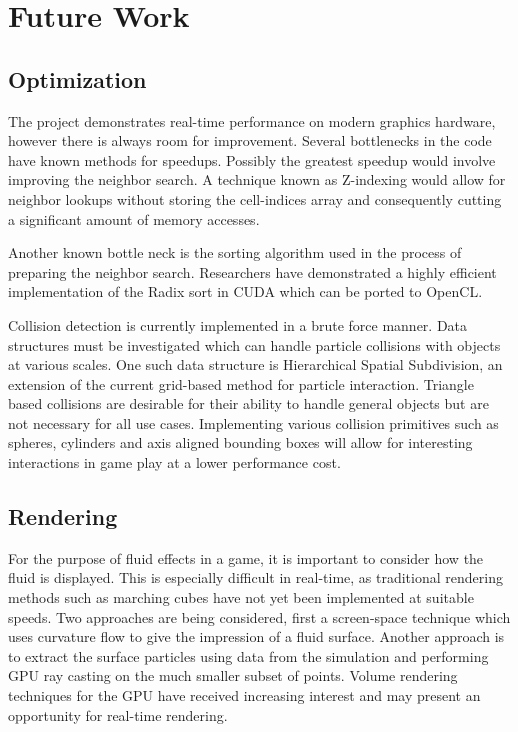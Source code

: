 \chapter{Future Work}

\section{Optimization}

The project demonstrates real-time performance on modern graphics hardware,
however there is always room for improvement. Several bottlenecks in the code
have known methods for speedups. Possibly the greatest speedup would involve
improving the neighbor search. A technique known as Z-indexing would allow for
neighbor lookups without storing the cell-indices array and consequently
cutting a significant amount of memory accesses.\cite{Goswami2010}


Another known bottle neck is the sorting algorithm used in the process of
preparing the neighbor search. Researchers have demonstrated a highly efficient
implementation of the Radix sort in CUDA\cite{Merrill:Sorting:2010} which can be ported to OpenCL.


Collision detection is currently implemented in a brute force manner. Data
structures must be investigated which can handle particle collisions with
objects at various scales. One such data structure is Hierarchical Spatial
Subdivision, an extension of the current grid-based method for particle
interaction.\cite{Pouchol2009} Triangle based collisions are desirable for
their ability to handle general objects but are not necessary for all use
cases. Implementing various collision primitives such as spheres, cylinders and
axis aligned bounding boxes will allow for interesting interactions in game
play at a lower performance cost. 


\section{Rendering}
For the purpose of fluid effects in a game, it is important to consider how the
fluid is displayed. This is especially difficult in real-time, as traditional
rendering methods such as marching cubes have not yet been implemented at
suitable speeds.
Two approaches are being considered, first a screen-space technique which uses
curvature flow to give the impression of a fluid surface.\cite{VanderLaan2009}
Another approach is to extract the surface particles using data from the
simulation and performing GPU ray casting on the much smaller subset of
points.\cite{Goswami2010} Volume rendering techniques for the GPU have received
increasing interest and may present an opportunity for real-time
rendering.\cite{Fraedrich2010}


